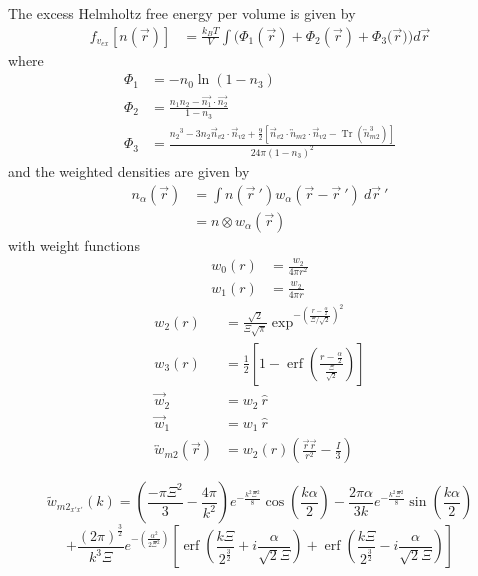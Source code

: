 \documentclass[double,12pt]{beavtex}
\begin{document}
The excess Helmholtz free energy per volume is given by
\begin{align}
    f_{v_{ex}}[n(\vec{r})] &= \frac{k_BT}{V}\int(\Phi_1(\vec{r})
    +\Phi_2(\vec{r})+\Phi_3(\vec{r}{)) d}\vec{r}
\end{align}     
where
\begin{align}
    \Phi_1 &= -n_{0}\ln(1-n_{3}) \\
    \Phi_2 &= \frac{n_{1}n_{2}-\vec{n_{1}}\cdot\vec{n_{2}}}{1-n_{3}} \\
    \Phi_3 &= \frac{{n_2}^3-3n_2\vec{n}_{v2}\cdot\vec{n}_{v2}+\frac{9}{2}
       [\vec{n}_{v2}\cdot{\overleftrightarrow{n}_{m2}}\cdot{\vec{n}_{v2}}
       -\operatorname{Tr}({\overleftrightarrow{n}^3_{m2}})]}{24\pi(1-n_3)^2}  
\end{align}
and the weighted densities are given by 
\begin{align}
    n_\alpha(\vec r) &= \int n(\vec {r}~')w_\alpha(\vec r-\vec {r}~')
                    ~d\vec {r}~'  \label{weighted_densities}  \\
                     &= n\otimes w_\alpha(\vec r)
\end{align}  
with weight functions
\begin{align}\label{eq:weights}
  w_{0}(r) &=\frac{w_{2}}{4\pi{r}^2} \\
  w_{1}(r) &=\frac{w_{2}}{4\pi{r}} 
\end{align}
\begin{align}
  w_2(r) &=\frac{\sqrt{2}}{\Xi\sqrt\pi}\exp^{-\left(\frac{r-\frac{\alpha}
           {2}}{\Xi/\sqrt{2}}\right)^2}  \\
  w_3(r) &=\frac{1}{2}\left[1-\operatorname{erf}\left(\frac{r
          -\frac{\alpha}{2}}{\frac{\Xi}{\sqrt{2}}}\right)\right]  \\
%    
      \vec {w}_2 &= w_2~\hat r \\
      \vec {w}_1 &= w_1~\hat r \\
      \overleftrightarrow{w}_{m2}(\vec{r}) &= w_2(r)\left(\frac{\vec{r}
                                        \vec{r}}{r^2}-\frac{I}{3}\right) 
\end{align}

\begin{equation}
    {\widetilde{w}_{{m2}_{x'x'}}(k)=\left(\frac{-\pi{\Xi}^2}{3}
   -\frac{4\pi}{k^2}\right)e^{-\frac{k^2\Xi^2}{8}}\cos(\frac{k\alpha}{2})
   -\frac{2\pi\alpha}{3k}e^{-\frac{k^2\Xi^2}{8}}\sin(\frac{k\alpha}{2})}\nonumber
\end{equation} 
\begin{equation} %
   {+\frac{{(2\pi)}^{\frac{3}{2}}}{k^3\Xi}e^{-\left(\frac{\alpha^2}
   {2\Xi^2}\right)}\left[\operatorname{erf}\left(\frac{k\Xi}{2^\frac{3}{2}}
   +i\frac{\alpha}{\sqrt{2}\Xi}\right)+\operatorname{erf}\left(\frac{k\Xi}
   {2^\frac{3}{2}}-i\frac{\alpha}{\sqrt{2}\Xi}\right)\right]}
\end{equation} 
\end{document}
